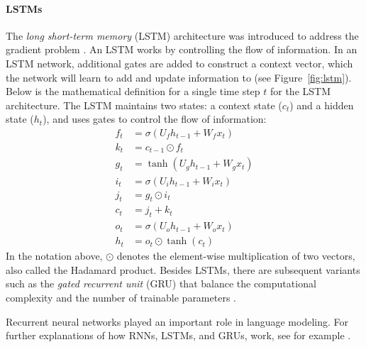 \paragraph{LSTMs} The \emph{long short-term memory} (LSTM) architecture was introduced to address the gradient problem  \citep{hochreiter1997long}. An LSTM works by controlling the flow of information. In an LSTM network, additional gates are added to construct a context vector, which the network will learn to add and update information to (see Figure~\ref{fig:lstm}). Below is the mathematical definition for a single time step $t$ for the LSTM architecture. The LSTM maintains two states: a context state ($c_t$) and a hidden state ($h_t$), and uses gates to control the flow of information:
\begin{align*}
    f_t &= \sigma(U_f h_{t-1} + W_f x_t) \\
    k_t &= c_{t-1} \odot f_t \\
    g_t &= \tanh(U_g h_{t-1} + W_g x_t) \\
    i_t &= \sigma(U_i h_{t-1} + W_i x_t) \\
    j_t &= g_t \odot i_t \\
    c_t &= j_t + k_t \\
    o_t &= \sigma(U_o h_{t-1} + W_o x_t) \\
    h_t &= o_t \odot \tanh(c_t)
\end{align*}
%
In the notation above, $\odot$ denotes the element-wise multiplication of two vectors, also called the Hadamard product. Besides LSTMs, there are subsequent variants such as the \emph{gated recurrent unit} (GRU) that balance the computational complexity and the number of trainable parameters \citep{cho2014gated}. 

Recurrent neural networks played an important role in language modeling. For further explanations of how RNNs, LSTMs, and GRUs, work, see for example \citet{olah2015understanding,bishop2023deep,goodfellow2014generative}.


